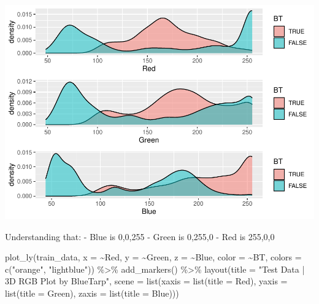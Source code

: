 \documentclass[
]{article}
\newenvironment{Shaded}{\begin{snugshade}}{\end{snugshade}}
\newcommand{\AttributeTok}[1]{\textcolor[rgb]{0.77,0.63,0.00}{#1}}
\newcommand{\FunctionTok}[1]{\textcolor[rgb]{0.00,0.00,0.00}{#1}}
\newcommand{\NormalTok}[1]{#1}
\newcommand{\SpecialCharTok}[1]{\textcolor[rgb]{0.00,0.00,0.00}{#1}}
\newcommand{\StringTok}[1]{\textcolor[rgb]{0.31,0.60,0.02}{#1}}
\begin{document}
\begin{center}\includegraphics{ProjectPart1_MERGED_files/figure-latex/density plots-1} \end{center}

Understanding that: - Blue is 0,0,255 - Green is 0,255,0 - Red is
255,0,0

\begin{Shaded}
\begin{Highlighting}[]
\FunctionTok{plot\_ly}\NormalTok{(train\_data, }\AttributeTok{x =} \SpecialCharTok{\textasciitilde{}}\NormalTok{Red, }\AttributeTok{y =} \SpecialCharTok{\textasciitilde{}}\NormalTok{Green, }\AttributeTok{z =} \SpecialCharTok{\textasciitilde{}}\NormalTok{Blue, }\AttributeTok{color =} \SpecialCharTok{\textasciitilde{}}\NormalTok{BT, }
        \AttributeTok{colors =} \FunctionTok{c}\NormalTok{(}\StringTok{"orange"}\NormalTok{, }\StringTok{"lightblue"}\NormalTok{)) }\SpecialCharTok{\%\textgreater{}\%}
  \FunctionTok{add\_markers}\NormalTok{() }\SpecialCharTok{\%\textgreater{}\%}
  \FunctionTok{layout}\NormalTok{(}\AttributeTok{title =} \StringTok{"Test Data | 3D RGB Plot by BlueTarp"}\NormalTok{,}
         \AttributeTok{scene =} \FunctionTok{list}\NormalTok{(}\AttributeTok{xaxis =} \FunctionTok{list}\NormalTok{(}\AttributeTok{title =} \StringTok{\textquotesingle{}Red\textquotesingle{}}\NormalTok{),}
                      \AttributeTok{yaxis =} \FunctionTok{list}\NormalTok{(}\AttributeTok{title =} \StringTok{\textquotesingle{}Green\textquotesingle{}}\NormalTok{),}
                      \AttributeTok{zaxis =} \FunctionTok{list}\NormalTok{(}\AttributeTok{title =} \StringTok{\textquotesingle{}Blue\textquotesingle{}}\NormalTok{)))}
\end{Highlighting}
\end{Shaded}
\end{document}
